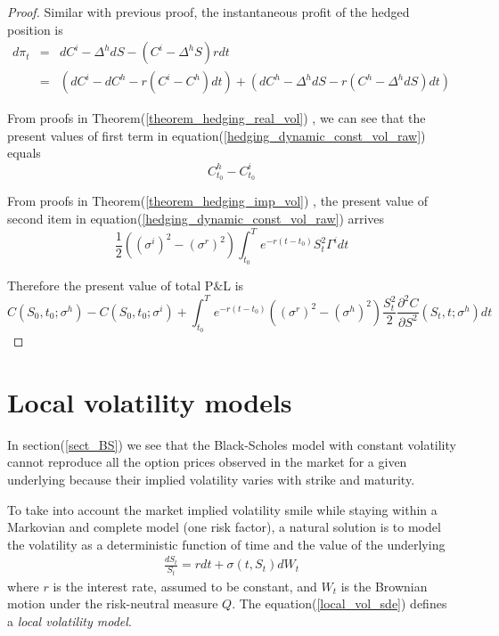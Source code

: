 \documentclass[10pt]{article}
\theoremstyle{plain}
\numberwithin{equation}{section}
\numberwithin{table}{section}
\newcommand{\s}{\sigma}
\newcommand{\prt}[1]{\left( #1 \right)}  %
\newcommand{\pa}{\partial}
\begin{document}
\begin{proof}
    Similar with previous proof, the instantaneous profit of the hedged position is
    \begin{eqnarray}
        d\pi_t &=& dC^i - \Delta^h dS - (C^i -\Delta^h S)rdt  \nonumber \\
        &=& \prt{dC^i - dC^h - r(C^i - C^h)dt} + \prt{dC^h - \Delta^h dS  - r(C^h-\Delta^h dS)dt}  
        \label{hedging_dynamic_const_vol_raw}
    \end{eqnarray}

    From proofs in Theorem(\ref{theorem_hedging_real_vol}) , we can see that the present values of first term in equation(\ref{hedging_dynamic_const_vol_raw}) equals
    \[
        C^h_{t_0} - C^i_{t_0}    
    \]

    From proofs in Theorem(\ref{theorem_hedging_imp_vol}) , the present value of second item in equation(\ref{hedging_dynamic_const_vol_raw}) arrives
    \[
        \frac{1}{2}\prt{(\s^i)^2 - (\s^r)^2 }  \int_{t_0}^T e^{-r(t-t_0)}  S^2_t \Gamma^i dt  
    \]
    
    Therefore the present value of total P$\&$L is 
    \[
        C(S_0,t_0;\s^h)-C(S_0,t_0;\s^i) + \int_{t_0}^T e^{-r(t-t_0)}((\s^r)^2-(\s^h)^2)\frac{S_t^2}{2}\frac{\pa^2 C}{\pa S^2}(S_t,t;\s^h) dt   
    \]

\end{proof}


\newpage 
\section{Local volatility models}

In section(\ref{sect_BS}) we see that the Black-Scholes model with constant volatility
cannot reproduce all the option prices observed in the market for a given underlying
because their implied volatility varies with strike and maturity.

To take
into account the market implied volatility smile while staying within a Markovian
and complete model (one risk factor), a natural solution is to model the
volatility as a deterministic function of time and the value of the underlying
\begin{eqnarray}
  \frac{dS_t}{S_t} = rdt + \s(t, S_t)dW_t  
  \label{local_vol_sde}
\end{eqnarray}
where $r$ is the interest rate, assumed to be constant, and $W_t$ is the Brownian motion
under the risk-neutral measure $Q$. The equation(\ref{local_vol_sde}) defines a \emph{local volatility
model}.
\end{document}
